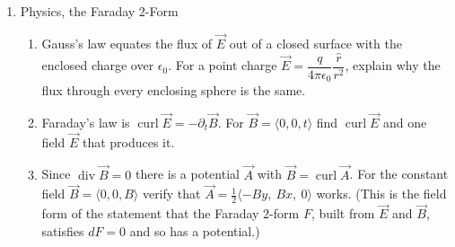 \documentclass[12pt]{article}
\newcounter{topic}
\begin{document}
\begin{enumerate}
\item Physics, the Faraday 2-Form
    \begin{enumerate}
        \item Gauss's law equates the flux of $\vec E$ out of a closed surface with the enclosed charge over $\epsilon_0$. For a point charge $\vec E=\dfrac{q}{4\pi\epsilon_0}\dfrac{\hat r}{r^2}$, explain why the flux through every enclosing sphere is the same.
        \item Faraday's law is $\operatorname{curl}\vec E=-\partial_t\vec B$. For $\vec B=\langle 0,0,t\rangle$ find $\operatorname{curl}\vec E$ and one field $\vec E$ that produces it.
        \item Since $\operatorname{div}\vec B=0$ there is a potential $\vec A$ with $\vec B=\operatorname{curl}\vec A$. For the constant field $\vec B=\langle 0,0,B\rangle$ verify that $\vec A=\tfrac12\langle -By,\ Bx,\ 0\rangle$ works. (This is the field form of the statement that the Faraday $2$-form $F$, built from $\vec E$ and $\vec B$, satisfies $dF=0$ and so has a potential.)
    \end{enumerate}
\setcounter{topic}{\value{enumi}}
\end{enumerate}
\end{document}
